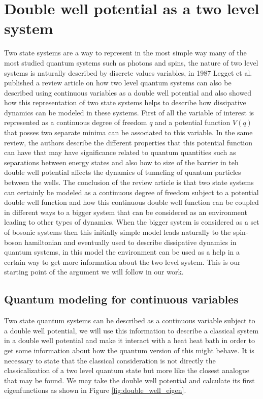 \section{Double well potential as a two level system}
Two state systems are a way to represent in the most simple way many of the most studied quantum systems such as photons and spins, the nature of two level systems is naturally described by discrete values variables, in 1987 Legget et al. \cite{leggett1987dynamics} published a review article on how two level quantum systems can also be described using continuous variables as a double well potential and also showed how this representation of two state systems helps to describe how dissipative dynamics can be modeled in these systems. First of all the variable of interest is represented as a continuous degree of freedom $q$ and a potential function $V(q)$ that posses two separate minima can be associated to this variable. In the same review, the authors describe the different properties that this potential function can have that may have significance related to quantum quantities such as separations between energy states and also how to size of the barrier in teh double well potential affects the dynamics of tunneling of quantum particles between the wells. The conclusion of the review article is that two state systems can certainly be modeled as a continuous degree of freedom subject to a potential double well function and how this continuous double well function can be coupled in different ways to a bigger system that can be considered as an environment leading to other types of dynamics. When the bigger system is considered as a set of bosonic systems then this initially simple model leads naturally to the spin-boson hamiltonian and eventually used to describe dissipative dynamics in quantum systems, in this model the environment can be used as a help in a certain way to get more information about the two level system. This is our starting point of the argument we will follow in our work.\par 

\subsection{Quantum modeling for continuous variables}
Two state quantum systems can be described as a continuous variable subject to a double well potential, we will use this information to describe a classical system in a double well potential and make it interact with a heat  heat bath in order to get some information about how the quantum version of this might behave. It is necessary to state that the classical consideration is not directly the classicalization of a two level quantum state but more like the closest analogue that may be found. We may take the double well potential and calculate its first eigenfunctions as shown in Figure \ref{fig:double_well_eigen}. 

